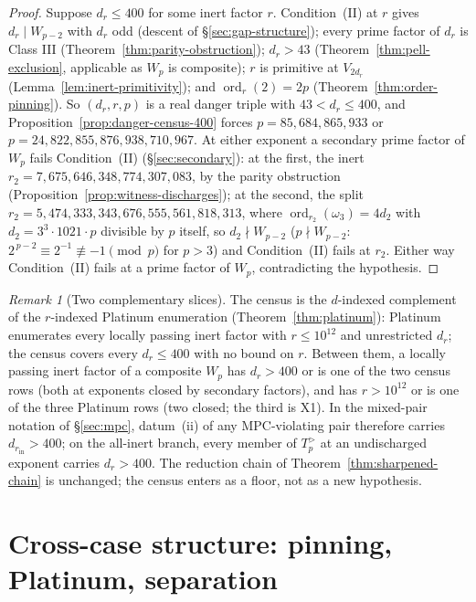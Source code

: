 \documentclass[11pt]{amsart}
\theoremstyle{plain}
\theoremstyle{definition}
\theoremstyle{remark}
\newtheorem{remark}[theorem]{Remark}
\numberwithin{equation}{section}
\newcommand{\ord}{\operatorname{ord}}
\begin{document}
\begin{proof}
Suppose $d_r \leq 400$ for some inert factor $r$. Condition~(II) at $r$ gives $d_r \mid W_{p-2}$ with $d_r$ odd (descent of \S\ref{sec:gap-structure}); every prime factor of $d_r$ is Class III (Theorem~\ref{thm:parity-obstruction}); $d_r > 43$ (Theorem~\ref{thm:pell-exclusion}, applicable as $W_p$ is composite); $r$ is primitive at $V_{2 d_r}$ (Lemma~\ref{lem:inert-primitivity}); and $\ord_r(2) = 2 p$ (Theorem~\ref{thm:order-pinning}). So $(d_r, r, p)$ is a real danger triple with $43 < d_r \leq 400$, and Proposition~\ref{prop:danger-census-400} forces $p = 85{,}684{,}865{,}933$ or $p = 24{,}822{,}855{,}876{,}938{,}710{,}967$. At either exponent a secondary prime factor of $W_p$ fails Condition~(II) (\S\ref{sec:secondary}): at the first, the inert $r_2 = 7{,}675{,}646{,}348{,}774{,}307{,}083$, by the parity obstruction (Proposition~\ref{prop:witness-discharges}); at the second, the split $r_2 = 5{,}474{,}333{,}343{,}676{,}555{,}561{,}818{,}313$, where $\ord_{r_2}(\omega_3) = 4 d_2$ with $d_2 = 3^3 \cdot 1021 \cdot p$ divisible by $p$ itself, so $d_2 \nmid W_{p-2}$ ($p \nmid W_{p-2}$: $2^{\,p-2} \equiv 2^{-1} \not\equiv -1 \pmod p$ for $p > 3$) and Condition~(II) fails at $r_2$. Either way Condition~(II) fails at a prime factor of $W_p$, contradicting the hypothesis.
\end{proof}

\begin{remark}[Two complementary slices]\label{rem:two-slices}
The census is the $d$-indexed complement of the $r$-indexed Platinum enumeration (Theorem~\ref{thm:platinum}): Platinum enumerates every locally passing inert factor with $r \leq 10^{12}$ and unrestricted $d_r$; the census covers every $d_r \leq 400$ with no bound on $r$. Between them, a locally passing inert factor of a composite $W_p$ has $d_r > 400$ or is one of the two census rows (both at exponents closed by secondary factors), and has $r > 10^{12}$ or is one of the three Platinum rows (two closed; the third is X1). In the mixed-pair notation of \S\ref{sec:mpc}, datum~(ii) of any MPC-violating pair therefore carries $d_{r_{\mathrm{in}}} > 400$; on the all-inert branch, every member of $T_p^{>}$ at an undischarged exponent carries $d_r > 400$. The reduction chain of Theorem~\ref{thm:sharpened-chain} is unchanged; the census enters as a floor, not as a new hypothesis.
\end{remark}

\section{Cross-case structure: pinning, Platinum, separation}\label{sec:cross-case}
\end{document}
